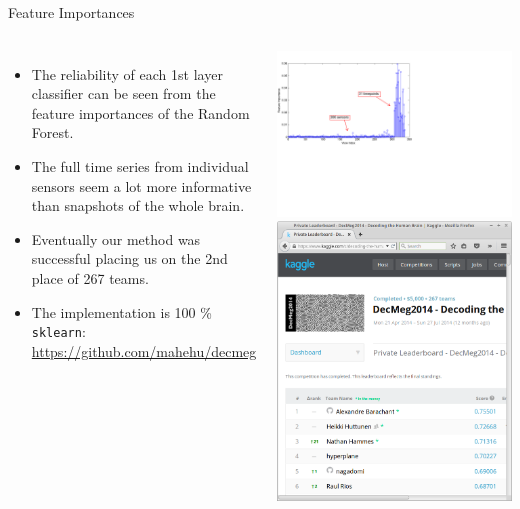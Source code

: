 \documentclass[10pt, aspectratio=169]{beamer} %
\begin{document}
\begin{frame}[fragile]{Feature Importances}
\begin{columns}
\begin{itemize}
\item The reliability of each 1st layer classifier can be seen from the
feature importances of the Random Forest.
\item The full time series from individual sensors seem a lot more
informative than snapshots of the whole brain.
\item Eventually our method was successful placing us on the 2nd place of
267 teams.
\item The implementation is 100 \% \texttt{sklearn}:
{\small \url{https://github.com/mahehu/decmeg}}
\end{itemize}
\includegraphics[width=\columnwidth]{images/Importances.pdf}\\
\includegraphics[width=\columnwidth]{images/DecMeg-results.png}

\end{columns}
\end{frame}
\end{document}
